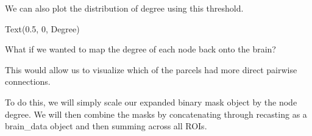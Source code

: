 \documentclass[letterpaper,10pt,english]{sphinxmanual}
\begin{document}
\noindent{}

We can also plot the distribution of degree using this threshold.

\begin{sphinxVerbatim}[commandchars=\\\{\}]
 
 
\end{sphinxVerbatim}

\begin{sphinxVerbatim}[commandchars=\\\{\}]
Text(0.5, 0, \PYGZsq{}Degree\PYGZsq{})
\end{sphinxVerbatim}

\noindent{}

What if we wanted to map the degree of each node back onto the brain?

This would allow us to visualize which of the parcels had more direct pairwise connections.

To do this, we will simply scale our expanded binary mask object by the node degree. We will then combine the masks by concatenating through recasting as a brain\_data object and then summing across all ROIs.

\begin{sphinxVerbatim}[commandchars=\\\{\}]
  
   
\end{sphinxVerbatim}

\noindent{}

\begin{sphinxVerbatim}[commandchars=\\\{\}]
\end{sphinxVerbatim}
\end{document}
